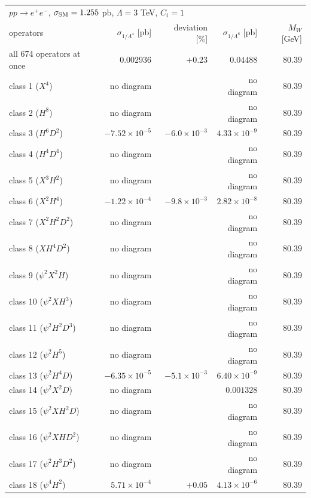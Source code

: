 \begin{table}[t]\centering\footnotesize\setlength{\tabcolsep}{4pt}
\begin{tabular}{@{}lrrrr@{}}\hline
\multicolumn{5}{l}{$p p \to e^+ e^-$, $\sigma_{\rm SM} = 1.255$ pb, $\Lambda = 3$ TeV, $C_i = 1$}\\
operators & $\sigma_{1/\Lambda^4}$ [pb] & deviation [\%] & $\sigma_{1/\Lambda^8}$ [pb] & $M_W$ [GeV]\\\hline
all 674 operators at once & $0.002936$ & $+0.23$ & $0.04488$ & $80.39$\\
class 1 ($X^4$) & no diagram &  & no diagram & $80.39$\\
class 2 ($H^8$) & no diagram &  & no diagram & $80.39$\\
class 3 ($H^6 D^2$) & $-7.52\times 10^{-5}$ & $-6.0\times 10^{-3}$ & $4.33\times 10^{-9}$ & $80.39$\\
class 4 ($H^4 D^4$) & no diagram &  & no diagram & $80.39$\\
class 5 ($X^3 H^2$) & no diagram &  & no diagram & $80.39$\\
class 6 ($X^2 H^4$) & $-1.22\times 10^{-4}$ & $-9.8\times 10^{-3}$ & $2.82\times 10^{-8}$ & $80.39$\\
class 7 ($X^2 H^2 D^2$) & no diagram &  & no diagram & $80.39$\\
class 8 ($X H^4 D^2$) & no diagram &  & no diagram & $80.39$\\
class 9 ($\psi^2 X^2 H$) & no diagram &  & no diagram & $80.39$\\
class 10 ($\psi^2 X H^3$) & no diagram &  & no diagram & $80.39$\\
class 11 ($\psi^2 H^2 D^3$) & no diagram &  & no diagram & $80.39$\\
class 12 ($\psi^2 H^5$) & no diagram &  & no diagram & $80.39$\\
class 13 ($\psi^2 H^4 D$) & $-6.35\times 10^{-5}$ & $-5.1\times 10^{-3}$ & $6.40\times 10^{-9}$ & $80.39$\\
class 14 ($\psi^2 X^2 D$) & no diagram &  & $0.001328$ & $80.39$\\
class 15 ($\psi^2 X H^2 D$) & no diagram &  & no diagram & $80.39$\\
class 16 ($\psi^2 X H D^2$) & no diagram &  & no diagram & $80.39$\\
class 17 ($\psi^2 H^3 D^2$) & no diagram &  & no diagram & $80.39$\\
class 18 ($\psi^4 H^2$) & $5.71\times 10^{-4}$ & $+0.05$ & $4.13\times 10^{-6}$ & $80.39$\\

\end{tabular}
\end{table}
